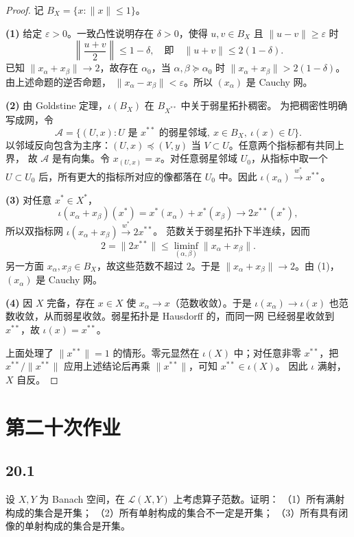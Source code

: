\begin{proof}
记 $B_X=\{x:\|x\|\leq1\}$。

\textbf{(1)} 给定 $\varepsilon>0$。一致凸性说明存在 $\delta>0$，使得 $u,v\in B_X$ 且
$\|u-v\|\geq\varepsilon$ 时
\[
 \left\|\frac{u+v}{2}\right\|\leq1-\delta,
 \quad\text{即}\quad \|u+v\|\leq2(1-\delta).
\]
已知 $\|x_\alpha+x_\beta\|\to2$，故存在 $\alpha_0$，当
$\alpha,\beta\succeq\alpha_0$ 时
$\|x_\alpha+x_\beta\|>2(1-\delta)$。由上述命题的逆否命题，
$\|x_\alpha-x_\beta\|<\varepsilon$。所以 $(x_\alpha)$ 是 Cauchy 网。

\textbf{(2)} 由 Goldstine 定理，$\iota(B_X)$ 在 $B_{X^{**}}$ 中关于弱星拓扑稠密。
为把稠密性明确写成网，令
\[
 \mathcal A=\{(U,x):U\text{ 是 }x^{**}\text{ 的弱星邻域},\ x\in B_X,
 \ \iota(x)\in U\}.
\]
以邻域反向包含为主序：$(U,x)\preceq(V,y)$ 当 $V\subset U$。任意两个指标都有共同上界，
故 $\mathcal A$ 是有向集。令 $x_{(U,x)}=x$。对任意弱星邻域 $U_0$，从指标中取一个
$U\subset U_0$ 后，所有更大的指标所对应的像都落在 $U_0$ 中。因此
$\iota(x_\alpha)\overset{w^*}{\longrightarrow}x^{**}$。

\textbf{(3)} 对任意 $x^*\in X^*$，
\[
 \iota(x_\alpha+x_\beta)(x^*)=x^*(x_\alpha)+x^*(x_\beta)
 \longrightarrow2x^{**}(x^*),
\]
所以双指标网 $\iota(x_\alpha+x_\beta)\overset{w^*}{\longrightarrow}2x^{**}$。
范数关于弱星拓扑下半连续，因而
\[
 2=\|2x^{**}\|\leq\liminf_{(\alpha,\beta)}\|x_\alpha+x_\beta\|.
\]
另一方面 $x_\alpha,x_\beta\in B_X$，故这些范数不超过 $2$。于是
$\|x_\alpha+x_\beta\|\to2$。由 (1)，$(x_\alpha)$ 是 Cauchy 网。

\textbf{(4)} 因 $X$ 完备，存在 $x\in X$ 使 $x_\alpha\to x$（范数收敛）。于是
$\iota(x_\alpha)\to\iota(x)$ 也范数收敛，从而弱星收敛。弱星拓扑是 Hausdorff 的，而同一网
已经弱星收敛到 $x^{**}$，故 $\iota(x)=x^{**}$。

上面处理了 $\|x^{**}\|=1$ 的情形。零元显然在 $\iota(X)$ 中；对任意非零 $x^{**}$，把
$x^{**}/\|x^{**}\|$ 应用上述结论后再乘 $\|x^{**}\|$，可知 $x^{**}\in\iota(X)$。
因此 $\iota$ 满射，$X$ 自反。
\end{proof}

\section{第二十次作业}

\subsection*{20.1}
\begin{problem}
设 $X,Y$ 为 Banach 空间，在 $\mathcal L(X,Y)$ 上考虑算子范数。证明：
（1）所有满射构成的集合是开集；
（2）所有单射构成的集合不一定是开集；
（3）所有具有闭像的单射构成的集合是开集。
\end{problem}

